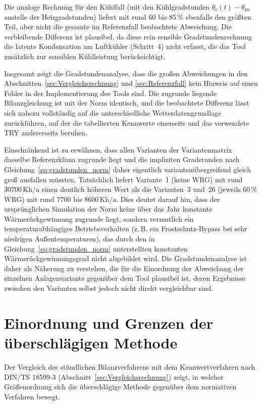 \documentclass{scrreprt}
\begin{document}
Die analoge Rechnung für den Kühlfall (mit den Kühlgradstunden
$\theta_{\mathrm{e}}(t)-\theta_{\mathrm{zu}}$ anstelle der
Heizgradstunden) liefert mit rund \num{60} bis \num{85}\,\% ebenfalls den
größten Teil, aber nicht die gesamte im Referenzfall beobachtete
Abweichung. Die verbleibende Differenz ist plausibel, da diese rein
sensible Gradstundenrechnung die latente Kondensation am Luftkühler
(Schritt~4) nicht erfasst, die das Tool zusätzlich zur sensiblen
Kühlleistung berücksichtigt.

Insgesamt zeigt die Gradstundenanalyse, dass die großen Abweichungen
in den Abschnitten~\ref{sec:Vergleichsrechnung} und
\ref{sec:Referenzfall} kein Hinweis auf einen Fehler in der
Implementierung des Tools sind. Die zugrunde liegende Bilanzgleichung
ist mit der Norm identisch, und die beobachtete Differenz lässt sich
nahezu vollständig auf die unterschiedliche Wetterdatengrundlage
zurückführen, auf der die tabellierten Kennwerte einerseits und das
verwendete \ac{TRY} andererseits beruhen.

Einschränkend ist zu erwähnen, dass allen Varianten der
Variantenmatrix dasselbe Referenzklima zugrunde liegt und die
impliziten Gradstunden nach Gleichung~\eqref{eq:gradstunden_norm}
daher eigentlich variantenübergreifend gleich groß ausfallen müssten.
Tatsächlich liefert Variante~1 (keine WRG) mit rund
$30700\,\mathrm{Kh/a}$ einen deutlich höheren Wert als die Varianten~3
und~26 (jeweils $60\,\%$ WRG) mit rund $7700$ bis
$8600\,\mathrm{Kh/a}$. Dies deutet darauf hin, dass der ursprünglichen
Simulation der Norm keine über das Jahr konstante Wärmerückgewinnung
zugrunde liegt, sondern vermutlich ein temperaturabhängiges
Betriebsverhalten (z.\,B. ein Frostschutz-Bypass bei sehr niedrigen
Außentemperaturen), das durch den in
Gleichung~\eqref{eq:gradstunden_norm} unterstellten konstanten
Wärmerückgewinnungsgrad nicht abgebildet wird. Die Gradstundenanalyse
ist daher als Näherung zu verstehen, die für die Einordnung der
Abweichung der einzelnen Anlagenvariante gegenüber dem Tool
plausibel ist, deren Ergebnisse zwischen den Varianten selbst jedoch
nicht direkt vergleichbar sind.

\section{Einordnung und Grenzen der überschlägigen Methode}
Der Vergleich des stündlichen Bilanzverfahrens mit dem
Kennwertverfahren nach DIN/TS 18599-3 (Abschnitt~\ref{sec:Vergleichsrechnung})
zeigt, in welcher Größenordnung sich die überschlägige Methode
gegenüber dem normativen Verfahren bewegt.
\end{document}
